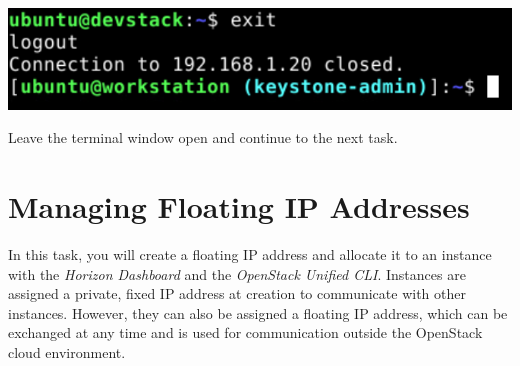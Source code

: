 \documentclass[letterpaper, 12pt]{article}
\begin{document}
\begin{enumerate}
\begin{labstep}
        \begin{center}
            \includegraphics[width=\linewidth]{images/part2/step19.png}
        \end{center}
    \end{labstep}

    \begin{labstep}
        Leave the terminal window open and continue to the next task.
    \end{labstep}

\end{enumerate}

\section{Managing Floating IP Addresses}\label{sec:managing-floating-ip-addresses}
In this task, you will create a floating IP address and allocate it to an instance with the \textit{Horizon Dashboard} and the \textit{OpenStack Unified CLI}.
Instances are assigned a private, fixed IP address at creation to communicate with other instances.
However, they can also be assigned a floating IP address, which can be exchanged at any time and is used for communication outside the OpenStack cloud environment.
\end{document}
